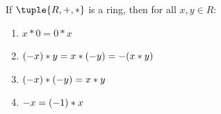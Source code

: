 \begin{thm}
    \label{thm:ring-basic-properties}
    If \( \tuple{R,+,\ast} \) is a ring, then for all \( x,y \in R \):
    \begin{enumerate}[topsep=2pt,noitemsep,label=\textup{\texttt{(\alph*)}}]
        \item \( x \ast 0 = 0 \ast x \) \label{enum:ring-product-with-zero}
        \item \( \mleft( -x \mright) \ast y = x \ast \mleft( -y \mright) = - \mleft( x \ast y \mright) \)
                \label{enum:ring-single-negative-sign-product}
        \item \( \mleft( -x \mright) \ast \mleft( -y \mright) = x \ast y \)
                \label{enum:ring-double-negative-signs-product}
        \item \( -x = \mleft( -1 \mright) \ast x \)
                \label{enum:ring-negative-element-is-negative-one-times-element}
    \end{enumerate}
\end{thm}

